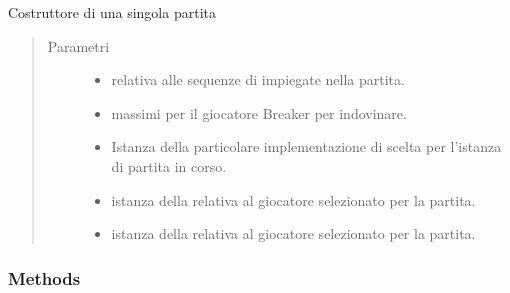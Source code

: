 \documentclass[letterpaper,10pt,italian,openany,oneside]{sphinxmanual}
\begin{document}
\begin{fulllineitems}
\label{\detokenize{source/it/unicam/cs/pa/mastermind/gamecore/SingleMatch:it.unicam.cs.pa.mastermind.gamecore.SingleMatch.SingleMatch(int, int, GameViewFactory, BreakerFactory, MakerFactory)}}
Costruttore di una singola partita
\begin{quote}\begin{description}
\item[{Parametri}] \leavevmode\begin{itemize}
\item {} 
 \textendash{} relativa alle sequenze di  impiegate nella partita.

\item {} 
 \textendash{} massimi per il giocatore Breaker per indovinare.

\item {} 
 \textendash{} Istanza della particolare implementazione di  scelta per l’istanza di partita in corso.

\item {} 
 \textendash{} istanza della  relativa al giocatore  selezionato per la partita.

\item {} 
 \textendash{} istanza della  relativa al giocatore  selezionato per la partita.

\end{itemize}

\end{description}\end{quote}

\end{fulllineitems}



\subsubsection{Methods}
\label{\detokenize{source/it/unicam/cs/pa/mastermind/gamecore/SingleMatch:methods}}
\end{document}
